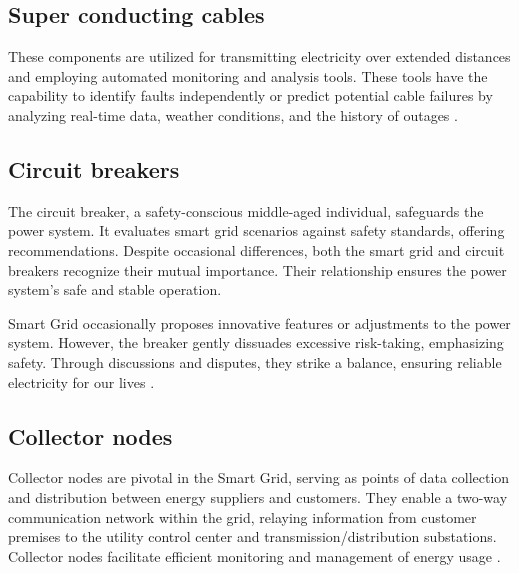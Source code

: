 






\subsection{Super conducting cables}
These components are utilized for transmitting electricity over extended distances and employing automated monitoring and analysis tools. These tools have the capability to identify faults independently or predict potential cable failures by analyzing real-time data, weather conditions, and the history of outages \cite{elprocus_smartgrid}.
\subsection{Circuit breakers}
The circuit breaker, a safety-conscious middle-aged individual, safeguards the power system. It evaluates smart grid scenarios against safety standards, offering recommendations. Despite occasional differences, both the smart grid and circuit breakers recognize their mutual importance. Their relationship ensures the power system’s safe and stable operation.

Smart Grid occasionally proposes innovative features or adjustments to the power system. However, the breaker gently dissuades excessive risk-taking, emphasizing safety. Through discussions and disputes, they strike a balance, ensuring reliable electricity for our lives \cite{linkedin_smartgrid_circuitbreaker}.
\subsection{Collector nodes}

Collector nodes are pivotal in the Smart Grid, serving as points of data collection and distribution between energy suppliers and customers. They enable a two-way communication network within the grid, relaying information from customer premises to the utility control center and transmission/distribution substations. Collector nodes facilitate efficient monitoring and management of energy usage \cite{cunjiang2012architecture}.

